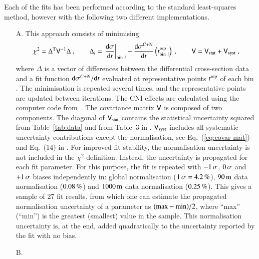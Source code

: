 Each of the fits has been performed according to the standard least-squares method, however with the following two different implementations.

\begin{enumerate}

\item[A.] This approach consists of minimising
\begin{equation}
\label{eq:chi sq A}
	\chi^2 = \Delta^{\rm T} \mathsf{V}^{-1} \Delta\ ,\qquad
	\Delta_i = \left.{{\rm d}\sigma\over {\rm d} t}\right|_{{\rm bin}\ i} - {{\rm d}\sigma^{\rm C+N}\over{\rm d} t}\left(t^{\rm rep}_{{\rm bin}\ i}\right)\ ,\qquad
	\mathsf{V} = \mathsf{V}_{\rm stat} + \mathsf{V}_{\rm syst}\ ,
\end{equation}
where $\Delta$ is a vector of differences between the differential cross-section data and a fit function ${\rm d}\sigma^{C+N}/{\rm d} t$ evaluated at representative points $t^{\rm rep}$ of each bin \cite{lafferty94}. The minimisation is repeated several times, and the representative points are updated between iterations. The CNI effects are calculated using the computer code from~\cite{elegent}. The covariance matrix $\mathsf{V}$ is composed of two components. The diagonal of $\mathsf{V}_{\rm stat}$ contains the statistical uncertainty squared from Table~\ref{tab:data} and from Table~3 in \cite{8tev-90m}. $\mathsf{V}_{\rm syst}$ includes all systematic uncertainty contributions except the normalisation, see Eq.~(\ref{eq:covar mat}) and Eq.~(14) in \cite{8tev-90m}. For improved fit stability, the normalisation uncertainty is not included in the $\chi^2$ definition. Instead, the uncertainty is propagated for each fit parameter. For this purpose, the fit is repeated with $-1\,{\rm \sigma}$, $0\,{\rm \sigma}$ and $+1\,{\rm \sigma}$ biases independently in: global normalisation ($1\,{\rm \sigma} = 4.2\,{\rm \%}$), $90\,{\rm m}$ data normalisation ($0.08\,{\rm \%}$) and $1000\,{\rm m}$ data normalisation ($0.25\,{\rm \%}$). This gives a sample of 27 fit results, from which one can estimate the propagated normalisation uncertainty of a parameter as $(\hbox{max} - \hbox{min})/2$, where ``max'' (``min'') is the greatest (smallest) value in the sample. This normalisation uncertainty is, at the end, added quadratically to the uncertainty reported by the fit with no bias.


\item[B.] 

\end{enumerate}



